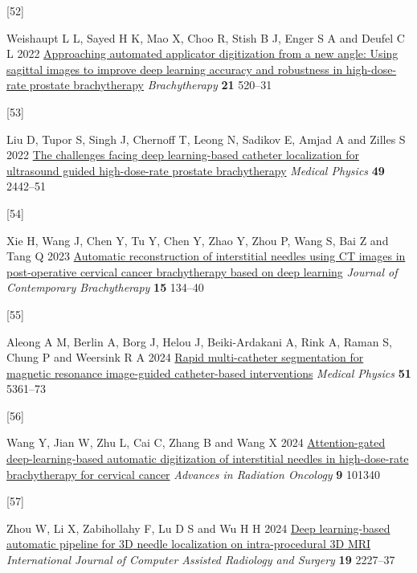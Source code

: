 \documentclass[
  11pt,
]{article}
\newlength{\cslhangindent}
\newlength{\csllabelwidth}
\newenvironment{CSLReferences}[2] %
 {\begin{list}{}{%
  \setlength{\itemindent}{0pt}
  \setlength{\leftmargin}{0pt}
  \setlength{\parsep}{0pt}
  \ifodd #1
   \setlength{\leftmargin}{\cslhangindent}
   \setlength{\itemindent}{-1\cslhangindent}
  \fi
  \setlength{\itemsep}{#2\baselineskip}}}
 {\end{list}}
\newcommand{\CSLLeftMargin}[1]{\parbox[t]{\csllabelwidth}{\strut#1\strut}}
\newcommand{\CSLRightInline}[1]{\parbox[t]{\linewidth - \csllabelwidth}{\strut#1\strut}}
\begin{document}
\begin{CSLReferences}{0}{1}
\CSLLeftMargin{{[}52{]} }%
\CSLRightInline{Weishaupt L L, Sayed H K, Mao X, Choo R, Stish B J,
Enger S A and Deufel C L 2022
\href{https://doi.org/10.1016/j.brachy.2022.02.005}{Approaching
automated applicator digitization from a new angle: Using sagittal
images to improve deep learning accuracy and robustness in
high-dose-rate prostate brachytherapy} \emph{Brachytherapy} \textbf{21}
520--31}

\CSLLeftMargin{{[}53{]} }%
\CSLRightInline{Liu D, Tupor S, Singh J, Chernoff T, Leong N, Sadikov E,
Amjad A and Zilles S 2022 \href{https://doi.org/10.1002/mp.15522}{The
challenges facing deep learning-based catheter localization for
ultrasound guided high-dose-rate prostate brachytherapy} \emph{Medical
Physics} \textbf{49} 2442--51}

\CSLLeftMargin{{[}54{]} }%
\CSLRightInline{Xie H, Wang J, Chen Y, Tu Y, Chen Y, Zhao Y, Zhou P,
Wang S, Bai Z and Tang Q 2023
\href{https://doi.org/10.5114/jcb.2023.126514}{Automatic reconstruction
of interstitial needles using {CT} images in post-operative cervical
cancer brachytherapy based on deep learning} \emph{Journal of
Contemporary Brachytherapy} \textbf{15} 134--40}

\CSLLeftMargin{{[}55{]} }%
\CSLRightInline{Aleong A M, Berlin A, Borg J, Helou J, Beiki-Ardakani A,
Rink A, Raman S, Chung P and Weersink R A 2024
\href{https://doi.org/10.1002/mp.17117}{Rapid multi-catheter
segmentation for magnetic resonance image-guided catheter-based
interventions} \emph{Medical Physics} \textbf{51} 5361--73}

\CSLLeftMargin{{[}56{]} }%
\CSLRightInline{Wang Y, Jian W, Zhu L, Cai C, Zhang B and Wang X 2024
\href{https://doi.org/10.1016/j.adro.2023.101340}{Attention-gated
deep-learning-based automatic digitization of interstitial needles in
high-dose-rate brachytherapy for cervical cancer} \emph{Advances in
Radiation Oncology} \textbf{9} 101340}

\CSLLeftMargin{{[}57{]} }%
\CSLRightInline{Zhou W, Li X, Zabihollahy F, Lu D S and Wu H H 2024
\href{https://doi.org/10.1007/s11548-024-03077-3}{Deep learning-based
automatic pipeline for {3D} needle localization on intra-procedural {3D}
{MRI}} \emph{International Journal of Computer Assisted Radiology and
Surgery} \textbf{19} 2227--37}


\end{CSLReferences}
\end{document}
